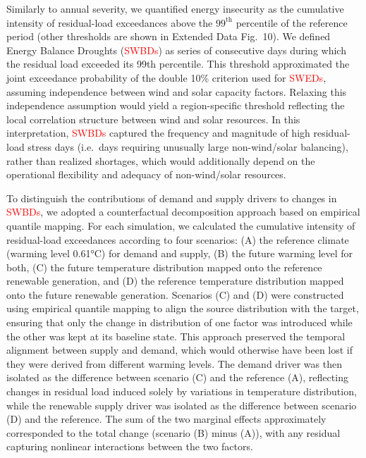 \documentclass[pdflatex,sn-mathphys-num]{sn-jnl}%
\begin{document}
Similarly to annual severity, we quantified energy insecurity as the cumulative intensity of residual-load exceedances above the $99^{\mathrm{th}}$ percentile of the reference period (other thresholds are shown in Extended Data Fig.~10). We defined Energy Balance Droughts (\textcolor{red}{SWBDs}) as series of consecutive days during which the residual load exceeded its 99th percentile. This threshold approximated the joint exceedance probability of the double 10\% criterion used for \textcolor{red}{SWEDs}, assuming independence between wind and solar capacity factors. Relaxing this independence assumption would yield a region-specific threshold reflecting the local correlation structure between wind and solar resources. In this interpretation, \textcolor{red}{SWBDs} captured the frequency and magnitude of high residual-load stress days (i.e.\ days requiring unusually large non-wind/solar balancing), rather than realized shortages, which would additionally depend on the operational flexibility and adequacy of non-wind/solar resources.

To distinguish the contributions of demand and supply drivers to changes in \textcolor{red}{SWBDs}, we adopted a counterfactual decomposition approach based on empirical quantile mapping. For each simulation, we calculated the cumulative intensity of residual-load exceedances according to four scenarios: (A) the reference climate (warming level 0.61°C) for demand and supply, (B) the future warming level for both, (C) the future temperature distribution mapped onto the reference renewable generation, and (D) the reference temperature distribution mapped onto the future renewable generation. Scenarios (C) and (D) were constructed using empirical quantile mapping to align the source distribution with the target, ensuring that only the change in distribution of one factor was introduced while the other was kept at its baseline state. This approach preserved the temporal alignment between supply and demand, which would otherwise have been lost if they were derived from different warming levels. The demand driver was then isolated as the difference between scenario (C) and the reference (A), reflecting changes in residual load induced solely by variations in temperature distribution, while the renewable supply driver was isolated as the difference between scenario (D) and the reference. The sum of the two marginal effects approximately corresponded to the total change (scenario (B) minus (A)), with any residual capturing nonlinear interactions between the two factors.
\end{document}
